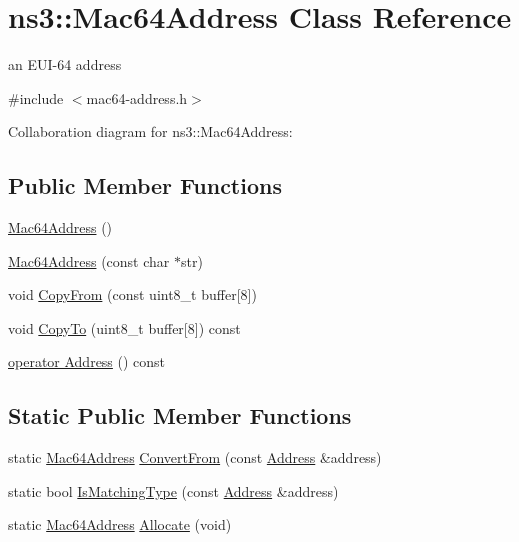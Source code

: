 \hypertarget{classns3_1_1Mac64Address}{}\section{ns3\+:\+:Mac64\+Address Class Reference}
\label{classns3_1_1Mac64Address}


an E\+U\+I-\/64 address  




{\ttfamily \#include $<$mac64-\/address.\+h$>$}



Collaboration diagram for ns3\+:\+:Mac64\+Address\+:
\subsection*{Public Member Functions}
\begin{DoxyCompactItemize}
\item 
\hyperlink{classns3_1_1Mac64Address_a8cdedaedd76ead556536ea877b5e97f0}{Mac64\+Address} ()
\item 
\hyperlink{classns3_1_1Mac64Address_aa5f02b23c9a80cb91a94fe0bf45f6fff}{Mac64\+Address} (const char $\ast$str)
\item 
void \hyperlink{classns3_1_1Mac64Address_a63d80b67023cef0a185f056205e9d9d7}{Copy\+From} (const uint8\+\_\+t buffer\mbox{[}8\mbox{]})
\item 
void \hyperlink{classns3_1_1Mac64Address_ada260b3937a820fce35e928a1f14229c}{Copy\+To} (uint8\+\_\+t buffer\mbox{[}8\mbox{]}) const 
\item 
\hyperlink{classns3_1_1Mac64Address_a41d0821d7e4bdd3fa0be6ed1a9c2bd83}{operator Address} () const 
\end{DoxyCompactItemize}
\subsection*{Static Public Member Functions}
\begin{DoxyCompactItemize}
\item 
static \hyperlink{classns3_1_1Mac64Address}{Mac64\+Address} \hyperlink{classns3_1_1Mac64Address_a9d73aef28cf6b6edf423b418ce014b10}{Convert\+From} (const \hyperlink{classns3_1_1Address}{Address} \&address)
\item 
static bool \hyperlink{classns3_1_1Mac64Address_a50014d1350f72b89857f0262be927073}{Is\+Matching\+Type} (const \hyperlink{classns3_1_1Address}{Address} \&address)
\item 
static \hyperlink{classns3_1_1Mac64Address}{Mac64\+Address} \hyperlink{classns3_1_1Mac64Address_a8020e9e303537062c6adc7c50721fbf5}{Allocate} (void)
\end{DoxyCompactItemize}
